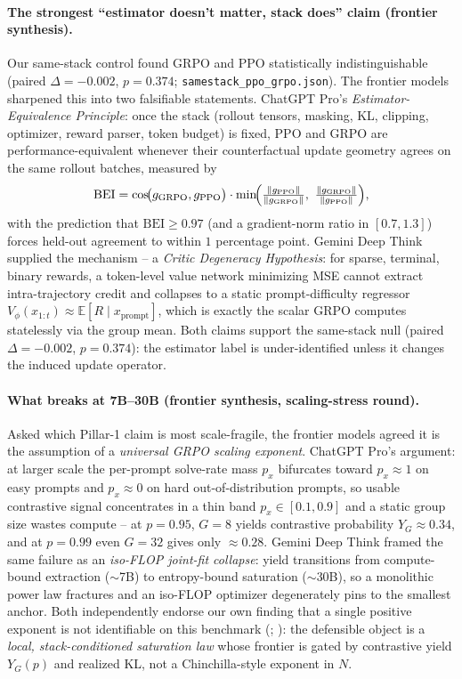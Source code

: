 \paragraph{The strongest ``estimator doesn't matter, stack does'' claim (frontier synthesis).}
Our same-stack control found GRPO and PPO statistically indistinguishable
(paired $\Delta = -0.002$, $p = 0.374$; \texttt{samestack\_ppo\_grpo.json}). The frontier models sharpened this
into two falsifiable statements. ChatGPT Pro's \emph{Estimator-Equivalence
Principle}: once the stack (rollout tensors, masking, KL, clipping, optimizer,
reward parser, token budget) is fixed, PPO and GRPO are performance-equivalent
whenever their counterfactual update geometry agrees on the same rollout
batches, measured by
\begin{equation}
  \label{eq:frontier-bei}
  \mathrm{BEI} = \cos\!\bigl(g_{\mathrm{GRPO}}, g_{\mathrm{PPO}}\bigr)\cdot
     \min\!\Bigl(
        \tfrac{\|g_{\mathrm{PPO}}\|}{\|g_{\mathrm{GRPO}}\|},\
        \tfrac{\|g_{\mathrm{GRPO}}\|}{\|g_{\mathrm{PPO}}\|}
     \Bigr),
\end{equation}
with the prediction that $\mathrm{BEI}\ge 0.97$ (and a gradient-norm ratio in
$[0.7,1.3]$) forces held-out agreement to within $1$ percentage point. Gemini
Deep Think supplied the mechanism -- a \emph{Critic Degeneracy Hypothesis}:
for sparse, terminal, binary rewards, a token-level value network minimizing
MSE cannot extract intra-trajectory credit and collapses to a static
prompt-difficulty regressor $V_\phi(x_{1:t}) \approx \mathbb{E}[R \mid
x_{\mathrm{prompt}}]$, which is exactly the scalar GRPO computes statelessly
via the group mean. Both claims support the same-stack null (paired
$\Delta=-0.002$, $p=0.374$): the estimator label
is under-identified unless it changes the induced update operator.

\paragraph{What breaks at 7B--30B (frontier synthesis, scaling-stress round).}
Asked which Pillar-1 claim is most scale-fragile, the frontier models agreed
it is the assumption of a \emph{universal GRPO scaling exponent}. ChatGPT Pro's
argument: at larger scale the per-prompt solve-rate mass $p_x$ bifurcates
toward $p_x\!\approx\!1$ on easy prompts and $p_x\!\approx\!0$ on hard
out-of-distribution prompts, so usable contrastive signal concentrates in a
thin band $p_x\in[0.1,0.9]$ and a static group size wastes compute -- at
$p=0.95$, $G=8$ yields contrastive probability $Y_G\approx 0.34$, and at
$p=0.99$ even $G=32$ gives only $\approx 0.28$. Gemini Deep Think framed the
same failure as an \emph{iso-FLOP joint-fit collapse}: yield transitions from
compute-bound extraction ($\sim$7B) to entropy-bound saturation ($\sim$30B),
so a monolithic power law fractures and an iso-FLOP optimizer degenerately
pins to the smallest anchor. Both independently endorse our own finding that
a single positive exponent is not identifiable on this benchmark
(\tableref{tab:scaling-cross}; \tableref{tab:scaling-iter25}): the defensible
object is a \emph{local, stack-conditioned saturation law} whose frontier is
gated by contrastive yield $Y_G(p)$ and realized KL, not a Chinchilla-style
exponent in $N$.

